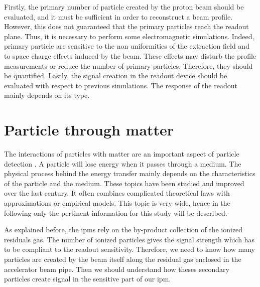 \begin{refsection}
  Firstly, the primary number of particle created by the proton beam should be evaluated, and it must be sufficient in order to reconstruct a beam profile. However, this does not guaranteed that the primary particles reach the readout plane. Thus, it is necessary to perform some electromagnetic simulations. Indeed, primary particle are sensitive to the non uniformities of the extraction field and to space charge effects induced by the beam. These effects may disturb the profile measurements or reduce the number of primary particles. Therefore, they should be quantified. Lastly, the signal creation in the readout device should be evaluated with respect to previous simulations. The response of the readout mainly depends on its type.

  \section{Particle through matter}
  The interactions of particles with matter are an important aspect of particle detection \cite{Knoll2010,Leo1994}. A particle will lose energy when it passes through a medium. The physical process behind the energy transfer mainly depends on the characteristics of the particle and the medium. These topics have been studied and improved over the last century. It often combines complicated theoretical laws with approximations or empirical models. This topic is very wide, hence in the following only the pertinent information for this study will be described.

  As explained before, the \acrshort{ipm}s rely on the by-product collection of the ionized residuals gas. The number of ionized particles gives the signal strength which has to be compliant to the readout sensitivity. Therefore, we need to know how many particles are created by the beam itself along the residual gas enclosed in the accelerator beam pipe. Then we should understand how theses secondary particles create signal in the sensitive part of our \acrshort{ipm}.



\end{refsection}
